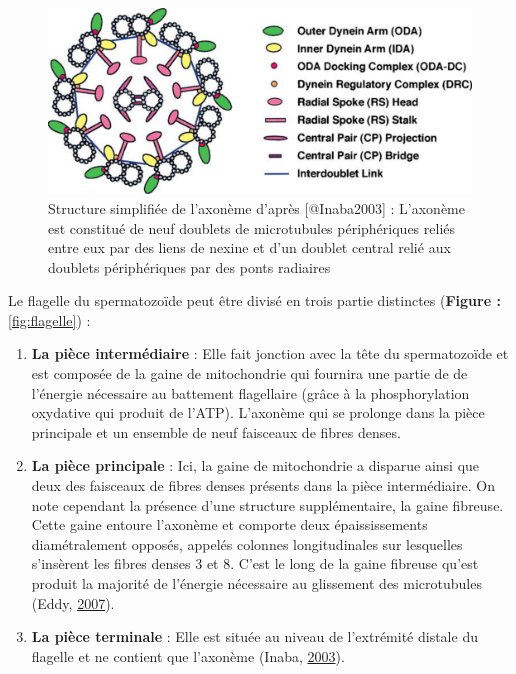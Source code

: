 \documentclass[12pt,twoside]{reedthesis}
\providecommand{\tightlist}{%
  \setlength{\itemsep}{0pt}\setlength{\parskip}{0pt}}
\theoremstyle{definition}
\theoremstyle{definition}
\theoremstyle{remark}
\begin{document}
  \begin{figure}
  
  {\centering \includegraphics[scale=.3]{figure/axoneme} 
  
  }
  
  \caption[Structure simplifiée de l'axonème]{Structure simplifiée de l'axonème d'après [@Inaba2003] : L'axonème est constitué de neuf doublets de microtubules périphériques reliés entre eux par des liens de nexine et d'un doublet central relié aux doublets périphériques par des ponts radiaires}\label{fig:axoneme}
  \end{figure}
  
  Le flagelle du spermatozoïde peut être divisé en trois partie distinctes
  (\textbf{Figure : }\ref{fig:flagelle}) :
  
  \begin{enumerate}
  \def\labelenumi{\arabic{enumi}.}
  \tightlist
  \item
    \textbf{La pièce intermédiaire} : Elle fait jonction avec la tête du
    spermatozoïde et est composée de la gaine de mitochondrie qui fournira
    une partie de de l'énergie nécessaire au battement flagellaire (grâce
    à la phosphorylation oxydative qui produit de l'ATP). L'axonème qui se
    prolonge dans la pièce principale et un ensemble de neuf faisceaux de
    fibres denses.\\
  \item
    \textbf{La pièce principale} : Ici, la gaine de mitochondrie a
    disparue ainsi que deux des faisceaux de fibres denses présents dans
    la pièce intermédiaire. On note cependant la présence d'une structure
    supplémentaire, la gaine fibreuse. Cette gaine entoure l'axonème et
    comporte deux épaississements diamétralement opposés, appelés colonnes
    longitudinales sur lesquelles s'insèrent les fibres denses 3 et 8.
    C'est le long de la gaine fibreuse qu'est produit la majorité de
    l'énergie nécessaire au glissement des microtubules (Eddy,
    \protect\hyperlink{ref-Eddy2007}{2007}).\\
  \item
    \textbf{La pièce terminale} : Elle est située au niveau de l'extrémité
    distale du flagelle et ne contient que l'axonème (Inaba,
    \protect\hyperlink{ref-Inaba2003}{2003}).
  \end{enumerate}
  
\end{document}
